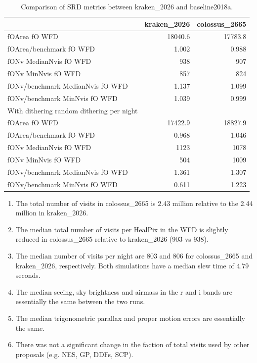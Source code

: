 \documentclass[DM,authoryear,toc]{lsstdoc}
\begin{document}
\begin{table}[htp]
\caption{Comparison of SRD metrics between kraken\_2026 and baseline2018a.}
\begin{center}
\small
\begin{tabular}{lrr}
\toprule
{}                                                                                       &   kraken\_2026 & colossus\_2665   \\
\midrule
 fOArea fO WFD                                           &      18040.6	&17783.8  \\
 fOArea/benchmark fO WFD                        &         1.002	& 0.988   \\
 fONv MedianNvis fO WFD                          &          938	& 907     \\
 fONv MinNvis fO WFD                                &            857	& 824     \\
 fONv/benchmark MedianNvis fO WFD       &         1.137	& 1.099  \\
 fONv/benchmark MinNvis fO WFD             &         1.039	& 0.999    \\
 \midrule
 With dithering random dithering per night    &  & \\
 fOArea fO WFD                                           &      17422.9	& 18827.9  \\
 fOArea/benchmark fO WFD                        &         0.968	& 1.046   \\
 fONv MedianNvis fO WFD                          &          1123	& 1078    \\
 fONv MinNvis fO WFD                                &           504	& 1009     \\
 fONv/benchmark MedianNvis fO WFD       &          1.361	& 1.307 \\
 fONv/benchmark MinNvis fO WFD             &         0.611	& 1.223   \\

\bottomrule
\end{tabular}
\end{center}
\label{tab:srd-comparison-2665}
\end{table}

\begin{enumerate}
\item The total number of visits in colossus\_2665 is 2.43 million relative to the 2.44 million in kraken\_2026.
\item The median total number of visits per HealPix in the WFD is slightly reduced in colossus\_2665 relative to kraken\_2026 (903 vs 938).
\item The median number of visits per night are 803 and 806 for colossus\_2665 and kraken\_2026, respectively.
Both simulations have a median slew time of 4.79 seconds.
\item The median seeing, sky brightness and airmass in the r and i bands are essentially the same between the two runs.
\item The median trigonometric parallax and proper motion errors are essentially the same.
\item There was not a significant change in the faction of total visits used by other proposals (e.g. NES, GP, DDFs, SCP).
\end{enumerate}
\end{document}
